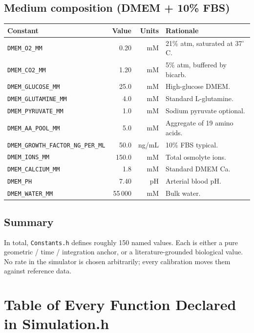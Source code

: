 \documentclass[11pt,letterpaper,twoside,openany]{book}
\newcommand{\code}[1]{\texttt{#1}}
\newcommand{\file}[1]{\texttt{\small#1}}
\begin{document}
\section{Medium composition (DMEM + 10\% FBS)}

\begin{longtable}{p{4.6cm}rrp{5.5cm}}
\toprule
Constant & Value & Units & Rationale\\ \midrule
\code{DMEM\_O2\_MM} & 0.20 & mM & 21\% atm, saturated at 37$^\circ$C.\\
\code{DMEM\_CO2\_MM} & 1.20 & mM & 5\% atm, buffered by bicarb.\\
\code{DMEM\_GLUCOSE\_MM} & 25.0 & mM & High-glucose DMEM.\\
\code{DMEM\_GLUTAMINE\_MM} & 4.0 & mM & Standard L-glutamine.\\
\code{DMEM\_PYRUVATE\_MM} & 1.0 & mM & Sodium pyruvate optional.\\
\code{DMEM\_AA\_POOL\_MM} & 5.0 & mM & Aggregate of 19 amino acids.\\
\code{DMEM\_GROWTH\_FACTOR\_NG\_PER\_ML} & 50.0 & ng/mL & 10\% FBS typical.\\
\code{DMEM\_IONS\_MM} & 150.0 & mM & Total osmolyte ions.\\
\code{DMEM\_CALCIUM\_MM} & 1.8 & mM & Standard DMEM Ca.\\
\code{DMEM\_PH} & 7.40 & pH & Arterial blood pH.\\
\code{DMEM\_WATER\_MM} & 55\,000 & mM & Bulk water.\\
\bottomrule
\end{longtable}

\section{Summary}

In total, \file{Constants.h} defines roughly 150 named values. Each
is either a pure geometric / time / integration anchor, or a
literature-grounded biological value. No rate in the simulator is
chosen arbitrarily; every calibration moves them against reference
data.

\chapter{Table of Every Function Declared in Simulation.h}
\label{ch:sim-funcs}
\end{document}
